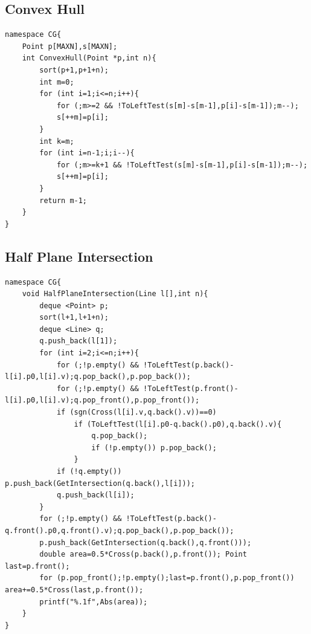 \documentclass[10pt]{ctexart}
\begin{document}
{\subsection{Convex Hull}
\begin{lstlisting}
namespace CG{
    Point p[MAXN],s[MAXN];
    int ConvexHull(Point *p,int n){
        sort(p+1,p+1+n);
        int m=0;
        for (int i=1;i<=n;i++){
            for (;m>=2 && !ToLeftTest(s[m]-s[m-1],p[i]-s[m-1]);m--);
            s[++m]=p[i];
        }
        int k=m;
        for (int i=n-1;i;i--){
            for (;m>=k+1 && !ToLeftTest(s[m]-s[m-1],p[i]-s[m-1]);m--);
            s[++m]=p[i];
        }
        return m-1;
    }
}
\end{lstlisting}
\subsection{Half Plane Intersection}
\begin{lstlisting}
namespace CG{
    void HalfPlaneIntersection(Line l[],int n){
        deque <Point> p;
        sort(l+1,l+1+n);
        deque <Line> q;
        q.push_back(l[1]);
        for (int i=2;i<=n;i++){
            for (;!p.empty() && !ToLeftTest(p.back()-l[i].p0,l[i].v);q.pop_back(),p.pop_back());
            for (;!p.empty() && !ToLeftTest(p.front()-l[i].p0,l[i].v);q.pop_front(),p.pop_front());
            if (sgn(Cross(l[i].v,q.back().v))==0)
                if (ToLeftTest(l[i].p0-q.back().p0),q.back().v){
                    q.pop_back();
                    if (!p.empty()) p.pop_back();
                }
            if (!q.empty()) p.push_back(GetIntersection(q.back(),l[i]));
            q.push_back(l[i]);
        }
        for (;!p.empty() && !ToLeftTest(p.back()-q.front().p0,q.front().v);q.pop_back(),p.pop_back());
        p.push_back(GetIntersection(q.back(),q.front()));
        double area=0.5*Cross(p.back(),p.front()); Point last=p.front();
        for (p.pop_front();!p.empty();last=p.front(),p.pop_front()) area+=0.5*Cross(last,p.front());
        printf("%.1f",Abs(area));
    }
}
\end{lstlisting}
}
\end{document}
